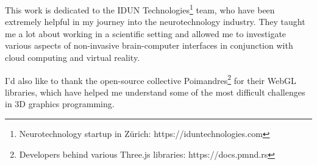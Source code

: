\begin{dedication}

  This work is dedicated to the IDUN Technologies\footnote{Neurotechnology startup in Zürich: https://iduntechnologies.com} team, who have been extremely helpful in my journey into the neurotechnology industry. They taught me a lot about working in a scientific setting and allowed me to investigate various aspects of non-invasive brain-computer interfaces in conjunction with cloud computing and virtual reality.

  \hfill \break

  I'd also like to thank the open-source collective Poimandres\footnote{Developers behind various Three.js libraries: https://docs.pmnd.rs}  for their WebGL libraries, which have helped me understand some of the most difficult challenges in 3D graphics programming.

\end{dedication}
